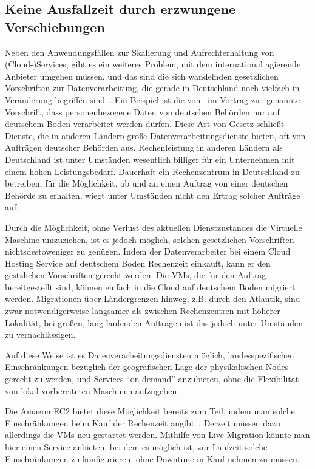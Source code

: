 \subsection{Keine Ausfallzeit durch erzwungene Verschiebungen}
\label{sec:keine-ausfallzeit}
Neben den Anwendungsfällen zur Skalierung und Aufrechterhaltung von
(Cloud-)Services, gibt es ein weiteres Problem, mit dem international
agierende Anbieter umgehen müssen, und das sind die sich wandelnden
gesetzlichen Vorschriften zur Datenverarbeitung, die gerade in
Deutschland noch vielfach in Veränderung begriffen
sind~\cite{bdsg-2009}. Ein Beispiel ist die von~\cite{MrBlah} im
Vortrag zu~\cite{foo} genannte Vorschrift, dass personenbezogene Daten
von deutschen Behörden nur auf deutschem Boden verarbeitet werden
dürfen. Diese Art von Gesetz schließt Dienste, die in anderen Ländern
große Datenverarbeitungsdienste bieten, oft von Aufträgen deutscher
Behörden aus. Rechenleistung in anderen Ländern als Deutschland ist
unter Umständen wesentlich billiger für ein Unternehmen mit einem
hohen Leistungsbedarf. Dauerhaft ein Rechenzentrum in Deutschland zu
betreiben, für die Möglichkeit, ab und an einen Auftrag von einer
deutschen Behörde zu erhalten, wiegt unter Umständen nicht den Ertrag
solcher Aufträge auf.

Durch die Möglichkeit, ohne Verlust des aktuellen Dienstzustandes die
Virtuelle Maschine umzuziehen, ist es jedoch möglich, solchen
gesetzlichen Vorschriften nichtsdestoweniger zu genügen. Indem der
Datenverarbeiter bei einem Cloud Hosting Service auf deutschem Boden
Rechenzeit einkauft, kann er den gestzlichen Vorschriften gerecht
werden. Die VMs, die für den Auftrag bereitgestellt sind, können
einfach in die Cloud auf deutschem Boden migriert werden. Migrationen
über Ländergrenzen hinweg, z.B. durch den Atlantik, sind zwar
notwendigerweise langsamer als zwischen Rechenzentren mit höherer
Lokalität, bei großen, lang laufenden Aufträgen ist das jedoch unter
Umständen zu vernachlässigen.

Auf diese Weise ist es Datenverarbeitungsdiensten möglich,
landesspezifischen Einschränkungen bezüglich der geografischen Lage
der physikalischen Nodes gerecht zu werden, und Services "`on-demand"'
anzubieten, ohne die Flexibilität von lokal vorbereiteten Maschinen
aufzugeben.

Die Amazon EC2 bietet diese Möglichkeit bereits zum Teil, indem man
solche Einschränkungen beim Kauf der Rechenzeit
angibt~\cite{none}. Derzeit müssen dazu allerdings die VMs neu
gestartet werden. Mithilfe von Live-Migration könnte man hier einen
Service anbieten, bei dem es möglich ist, zur Laufzeit solche
Einschränkungen zu konfigurieren, ohne Downtime in Kauf nehmen zu
müssen.

